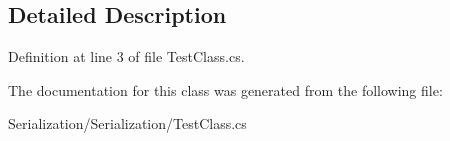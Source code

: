 \subsection{Detailed Description}


Definition at line 3 of file Test\-Class.\-cs.



The documentation for this class was generated from the following file\-:\begin{DoxyCompactItemize}
\item 
Serialization/\-Serialization/Test\-Class.\-cs\end{DoxyCompactItemize}
